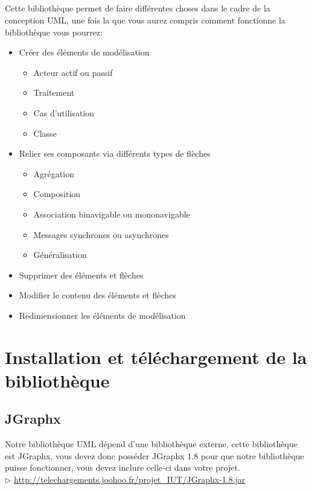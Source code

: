 \documentclass[12pt,a4paper,openany]{report}
\begin{document}
	\paragraph{}	
	Cette bibliothèque permet de faire différentes choses dans le cadre de la conception UML, une fois la
	que vous aurez compris comment fonctionne la bibliothèque vous pourrez:
	\begin{itemize}
		\item Créer des éléments de modélisation 
			\begin{itemize}
				\item Acteur actif ou passif
				\item Traitement
				\item Cas d'utilisation
				\item Classe
			\end{itemize}
		\item Relier ses composants via différents types de flèches
			\begin{itemize}
				\item Agrégation
				\item Composition
				\item Association binavigable ou mononavigable
				\item Messages synchrones ou asynchrones
				\item Généralisation
			\end{itemize}
		\item Supprimer des éléments et flèches
		\item Modifier le contenu des éléments et flèches
		\item Redimensionner les éléments de modélisation
	\end{itemize}
	\newpage
	\chapter{Installation et téléchargement de la bibliothèque}
	\section{JGraphx}
		Notre bibliothèque UML dépend d'une bibliothèque externe, cette bibliothèque est JGraphx, vous devez donc posséder JGraphx 1.8 pour que notre bibliothèque puisse fonctionner, vous devez inclure celle-ci dans votre projet.\\
	$\rhd$ \url{http://telechargements.joohoo.fr/projet\_IUT/JGraphx-1.8.jar}\\\\
\end{document}
